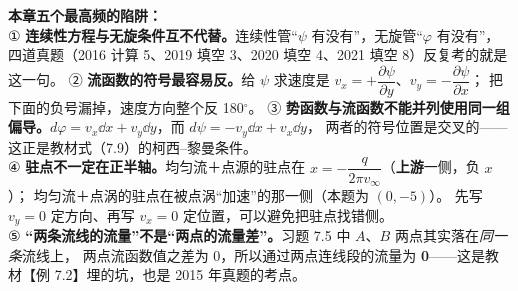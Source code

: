 \begin{yicuo}
\textbf{本章五个最高频的陷阱：}\\
① \textbf{连续性方程与无旋条件互不代替。}连续性管“$\psi$ 有没有”，无旋管“$\varphi$ 有没有”，
四道真题（2016 计算 5、2019 填空 3、2020 填空 4、2021 填空 8）反复考的就是这一句。
② \textbf{流函数的符号最容易反。}给 $\psi$ 求速度是 $v_x=+\dfrac{\partial\psi}{\partial y}$、$v_y=-\dfrac{\partial\psi}{\partial x}$；
把下面的负号漏掉，速度方向整个反 180$^\circ$。
③ \textbf{势函数与流函数不能并列使用同一组偏导。}$d\varphi=v_x\dd x+v_y\dd y$，而 $d\psi=-v_y\dd x+v_x\dd y$，
两者的符号位置是交叉的——这正是教材式（7.9）的柯西--黎曼条件。\\
④ \textbf{驻点不一定在正半轴。}均匀流＋点源的驻点在 $x=-\dfrac{q}{2\pi v_\infty}$（\textbf{上游}一侧，负 $x$）；
均匀流＋点涡的驻点在被点涡“加速”的那一侧（本题为 $(0,-5)$）。
先写 $v_y=0$ 定方向、再写 $v_x=0$ 定位置，可以避免把驻点找错侧。\\
⑤ \textbf{“两条流线的流量”不是“两点的流量差”。}习题 7.5 中 $A$、$B$ 两点其实落在\emph{同一条}流线上，
两点流函数值之差为 0，所以通过两点连线段的流量为 \textbf{0}——这是教材【例 7.2】埋的坑，也是 2015 年真题的考点。
\end{yicuo}

